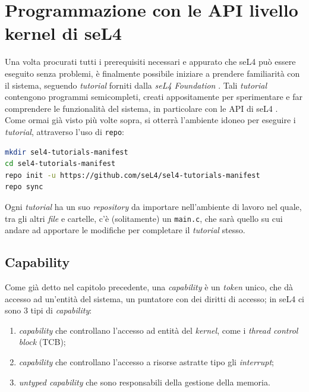 \section{Programmazione con le API livello kernel di seL4}
Una volta procurati tutti i prerequisiti necessari e appurato che seL4 può essere eseguito senza problemi, è finalmente possibile iniziare a prendere familiarità con il sistema, seguendo \textit{tutorial} forniti dalla \textit{seL4 Foundation} \cite{seL4Tutorial}. Tali \textit{tutorial} contengono programmi semicompleti, creati appositamente per sperimentare e far comprendere le funzionalità del sistema, in particolare con le API di seL4 \cite{sel4API}.\\
Come ormai già visto più volte sopra, si otterrà l'ambiente idoneo per eseguire i \textit{tutorial}, attraverso l'uso di \texttt{repo}:
\begin{lstlisting}[language=bash]
mkdir sel4-tutorials-manifest
cd sel4-tutorials-manifest
repo init -u https://github.com/seL4/sel4-tutorials-manifest
repo sync
\end{lstlisting}
Ogni \textit{tutorial} ha un suo \textit{repository} da importare nell'ambiente di lavoro nel quale, tra gli altri \textit{file} e cartelle, c'è (solitamente) un \texttt{main.c}, che sarà quello su cui andare ad apportare le modifiche per completare il \textit{tutorial} stesso.

\subsection{Capability}
Come già detto nel capitolo precedente, una \textit{capability} è un \textit{token} unico, che dà accesso ad un'entità del sistema, un puntatore con dei diritti di accesso; in seL4 ci sono 3 tipi di \textit{capability}:
\begin{enumerate}
	\item \textit{capability} che controllano l'accesso ad entità del \textit{kernel}, come i \textit{thread control block} (TCB);
	\item \textit{capability} che controllano l'accesso a risorse astratte tipo gli \textit{interrupt};
	\item \textit{untyped capability} che sono responsabili della gestione della memoria.
\end{enumerate}

